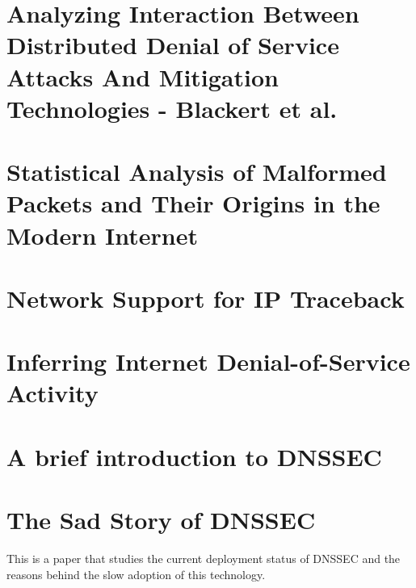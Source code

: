 \section{Analyzing Interaction Between Distributed Denial of Service Attacks And Mitigation Technologies - Blackert et al.}\label{section:DDoS}
\section{Statistical Analysis of Malformed Packets and Their Origins in the Modern Internet}\label{section:MalformedPackets}
\section{Network Support for IP Traceback}\label{section:IPTraceback}
\section{Inferring Internet Denial-of-Service Activity}\label{section:DoS}
\section{A brief introduction to DNSSEC}\label{section:DNSSEC}
\section{The Sad Story of DNSSEC}\label{section:SadDNSSEC}
This is a paper that studies the current deployment status of DNSSEC and the reasons behind the slow adoption of this technology. 
